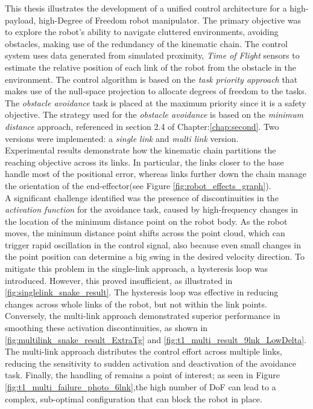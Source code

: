 \noindent This thesis illustrates the development of a unified control architecture for a high-payload, high-Degree of Freedom robot manipulator. The primary objective was to explore the robot's ability to navigate cluttered environments, avoiding obstacles, making use of the redundancy of the kinematic chain. The control system uses data generated from simulated proximity, \textit{Time of Flight} sensors to estimate the relative position of each link of the robot from the obstacle in the environment. The control algorithm is based on the \textit{task priority approach} that makes use of the null-space projection to allocate degrees of freedom to the tasks. The \textit{obstacle avoidance} task is placed at the maximum priority since it is a safety objective. The strategy used for the \textit{obstacle avoidance} is based on the \textit{minimum distance} approach, referenced in section 2.4 of Chapter:\ref{chap:second}. Two versions were implemented: a \textit{single link} and \textit{multi link} version.\\
\noindent Experimental results demonstrate how the kinematic chain partitions the reaching objective across its links. In particular, the links closer to the base handle most of the positional error, whereas links further down the chain manage the orientation of the end-effector(see Figure \ref{fig:robot_effects_graph}).\\
A significant challenge identified was the presence of discontinuities in the \textit{activation function} for the avoidance task, caused by high-frequency changes in the location of the minimum distance point on the robot body. As the robot moves, the minimum distance point shifts across the point cloud, which can trigger rapid oscillation in the control signal, also because even small changes in the point position can determine a big swing in the desired velocity direction. To mitigate this problem in the single-link approach, a hysteresis loop was introduced. However, this proved insufficient, as illustrated in \ref{fig:singlelink_snake_result}. The hysteresis loop was effective in reducing changes across whole links of the robot, but not within the link points. Conversely, the multi-link approach demonstrated superior performance in smoothing these activation discontinuities, as shown in \ref{fig:multilink_snake_result_ExtraTg} and \ref{fig:t1_multi_result_9lnk_LowDelta}. The multi-link approach distributes the control effort across multiple links, reducing the sensitivity to sudden activation and deactivation of the avoidance task. Finally, the handling of remains a point of interest; as seen in Figure \ref{fig:t1_multi_failure_photo_6lnk},the high number of DoF can lead to a complex, sub-optimal configuration that can block the robot in place.\\
